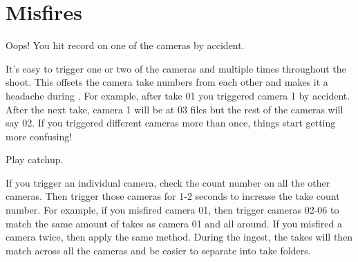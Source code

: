 \section{Misfires}
\pagecolor{white}
\label{chap:20}
\begin{fullwidth}

\problem

{\large Oops! You hit record on one of the cameras by accident. \par}

It’s easy to trigger one or two of the cameras and multiple times throughout the shoot. This offsets the camera take numbers from each other and makes it a headache during \textbf{}. For example, after take 01 you triggered camera 1 by accident. After the next take, camera 1 will be  at 03 files but the rest of the cameras will say 02. If you triggered different cameras more than once, things start getting more confusing!


\clearpage
\solution

{\large Play catchup. \par}

If you trigger an individual camera, check the count number on all the other cameras. Then trigger those cameras for 1-2 seconds to increase the take count number. For example, if you misfired camera 01, then trigger cameras 02-06 to match the same amount of takes as camera 01 and all around. If you misfired a camera twice, then apply the same method. During the ingest, the takes will then match across all the cameras and be easier to separate into take folders.  



\clearpage
\end{fullwidth}
